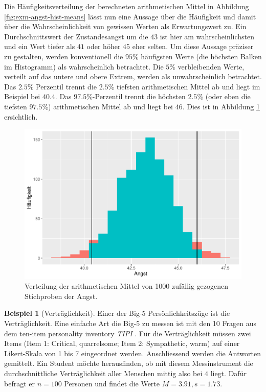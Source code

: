 \documentclass[
]{book}
\theoremstyle{definition}
\theoremstyle{definition}
\newtheorem{example}{Beispiel}[chapter]
\theoremstyle{definition}
\theoremstyle{definition}
\theoremstyle{remark}
\begin{document}
Die Häufigkeitsverteilung der berechneten arithmetischen Mittel in Abbildung \ref{fig:exm-angst-hist-means} lässt nun eine Aussage über die Häufigkeit und damit über die Wahrscheinlichkeit von gewissen Werten als Erwartungswert zu. Ein Durchschnittswert der Zustandesangst um die \(43\) ist hier am wahrscheinlichsten und ein Wert tiefer als \(41\) oder höher \(45\) eher selten. Um diese Aussage präziser zu gestalten, werden konventionell die \(95\)\% häufigsten Werte (die höchsten Balken im Histogramm) als wahrscheinlich betrachtet. Die \(5\)\% verbleibenden Werte, verteilt auf das untere und obere Extrem, werden als unwahrscheinlich betrachtet. Das \(2.5\)\% Perzentil trennt die \(2.5\)\% tiefsten arithmetischen Mittel ab und liegt im Beispiel bei \(40.4\). Das \(97.5\)\%-Perzentil trennt die höchsten \(2.5\)\% (oder eben die tiefsten \(97.5\)\%) arithmetischen Mittel ab und liegt bei \(46\). Dies ist in Abbildung \ref{fig:exm-angst-hist-means-emp-ci} ersichtlich.

\begin{figure}

{\centering \includegraphics{aps_statistik1_files/figure-latex/exm-angst-hist-means-emp-ci-1} 

}

\caption{Verteilung der arithmetischen Mittel von 1000 zufällig gezogenen Stichproben der Angst.}\label{fig:exm-angst-hist-means-emp-ci}
\end{figure}

\begin{example}[Verträglichkeit]
\protect\hypertarget{exm:agreableness}{}\label{exm:agreableness}Einer der Big-5 Persönlichkeitszüge ist die Verträglichkeit. Eine einfache Art die Big-5 zu messen ist mit den 10 Fragen aus dem ten-item personality inventory \emph{TIPI} \citep{gosling2003}. Für die Verträglichkeit müssen zwei Items (Item 1: Critical, quarrelsome; Item 2: Sympathetic, warm) auf einer Likert-Skala von 1 bis 7 eingeordnet werden. Anschliessend werden die Antworten gemittelt. Ein Student möchte herausfinden, ob mit diesem Messinstrument die durchschnittliche Verträglichkeit aller Menschen mittig also bei \(4\) liegt. Dafür befragt er \(n = 100\) Personen und findet die Werte \(M=3.91, s = 1.73\).
\end{example}
\end{document}
